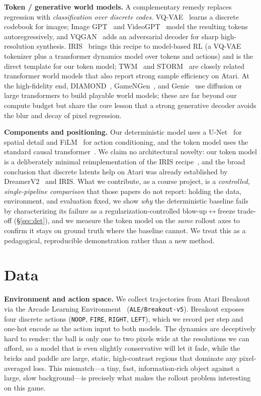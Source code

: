 \documentclass[10pt,twocolumn,letterpaper]{article}
\begin{document}
\textbf{Token / generative world models.} A complementary remedy replaces
regression with \emph{classification over discrete codes}. VQ-VAE~\cite{oord2017vqvae}
learns a discrete codebook for images; Image GPT~\cite{chen2020igpt} and
VideoGPT~\cite{yan2021videogpt} model the resulting tokens autoregressively, and
VQGAN~\cite{esser2021taming} adds an adversarial decoder for sharp
high-resolution synthesis. IRIS~\cite{micheli2023iris} brings this recipe to
model-based RL (a VQ-VAE tokenizer plus a transformer dynamics model over
tokens and actions) and is the direct template for our token model;
TWM~\cite{robine2023twm} and STORM~\cite{zhang2023storm} are closely related
transformer world models that also report strong sample efficiency on Atari.
At the high-fidelity end, DIAMOND~\cite{alonso2024diamond},
GameNGen~\cite{valevski2024gamengen}, and Genie~\cite{bruce2024genie} use
diffusion or large transformers to build playable world models; these are far
beyond our compute budget but share the core lesson that a strong generative
decoder avoids the blur and decay of pixel regression.

\textbf{Components and positioning.} Our deterministic model uses a
U-Net~\cite{ronneberger2015unet} for spatial detail and FiLM~\cite{perez2018film}
for action conditioning, and the token model uses the standard causal
transformer~\cite{vaswani2017attention}. We claim no architectural novelty: our
token model is a deliberately minimal reimplementation of the IRIS
recipe~\cite{micheli2023iris}, and the broad conclusion that discrete latents
help on Atari was already established by DreamerV2~\cite{hafner2021dreamerv2} and
IRIS. What we contribute, as a course project, is a \emph{controlled,
single-pipeline comparison} that those papers do not report: holding the data,
environment, and evaluation fixed, we show \emph{why} the deterministic baseline
fails by characterizing its failure as a regularization-controlled
blow-up$\leftrightarrow$freeze trade-off (\S\ref{sec:det}), and we measure the
token model on the \emph{same} rollout axes to confirm it stays on ground truth
where the baseline cannot. We treat this as a pedagogical, reproducible
demonstration rather than a new method.

\section{Data}

\textbf{Environment and action space.} We collect trajectories from Atari
Breakout via the Arcade Learning Environment~\cite{bellemare2013ale}
(\texttt{ALE/Breakout-v5}). Breakout exposes four discrete actions
(\texttt{NOOP}, \texttt{FIRE}, \texttt{RIGHT}, \texttt{LEFT}), which we record
per step and one-hot encode as the action input to both models. The dynamics are
deceptively hard to render: the ball is only one to two pixels wide at the
resolutions we can afford, so a model that is even slightly conservative will
let it fade, while the bricks and paddle are large, static, high-contrast
regions that dominate any pixel-averaged loss. This mismatch---a tiny, fast,
information-rich object against a large, slow background---is precisely what
makes the rollout problem interesting on this game.
\end{document}
